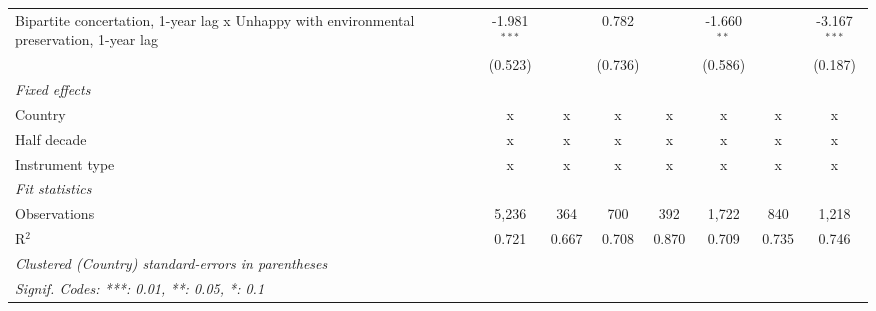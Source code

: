 \begin{table}[htbp]
\begin{tabular}{lccccccc}
      Bipartite concertation, 1-year lag x Unhappy with environmental preservation, 1-year lag & -1.981$^{***}$ &                           & 0.782          &                  & -1.660$^{**}$   &                 & -3.167$^{***}$\\   
                                                                                               & (0.523)        &                           & (0.736)        &                  & (0.586)         &                 & (0.187)\\   
      \emph{Fixed effects}\\
      Country                                                                                  & x              & x                         & x              & x                & x               & x               & x\\  
      Half decade                                                                              & x              & x                         & x              & x                & x               & x               & x\\  
      Instrument type                                                                          & x              & x                         & x              & x                & x               & x               & x\\  
      \midrule \emph{Fit statistics}\\
      Observations                                                                             & 5,236          & 364                       & 700            & 392              & 1,722           & 840             & 1,218\\  
      R$^2$                                                                                    & 0.721          & 0.667                     & 0.708          & 0.870            & 0.709           & 0.735           & 0.746\\  
      \midrule
      \multicolumn{8}{l}{\emph{Clustered (Country) standard-errors in parentheses}}\\
      \multicolumn{8}{l}{\emph{Signif. Codes: ***: 0.01, **: 0.05, *: 0.1}}\\
   \end{tabular}
\end{table}


